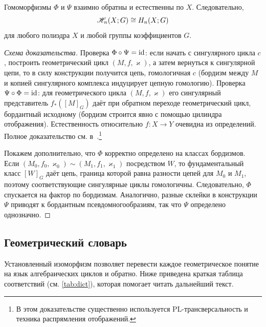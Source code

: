 \documentclass[12pt]{article}
\begin{document}
\begin{theorem}
Гомоморфизмы $\Phi$ и $\Psi$ взаимно обратны и естественны по $X$. Следовательно,
\begin{equation}\label{eq:BRSiso}
\mathscr{H}_n(X;G) \cong H_n(X;G)
\end{equation}
для любого полиэдра $X$ и любой группы коэффициентов $G$.
\end{theorem}
\begin{proof}[Схема доказательства]
Проверка $\Phi \circ \Psi = \operatorname{id}$: если начать с сингулярного цикла $c$, построить геометрический цикл $(M,f,\varkappa)$, а затем вернуться к сингулярной цепи, то в силу конструкции получится цепь, гомологичная $c$ (бордизм между $M$ и копией сингулярного комплекса индуцирует цепную гомологию). Проверка $\Psi \circ \Phi = \operatorname{id}$: для геометрического цикла $(M,f,\varkappa)$ его сингулярный представитель $f_*([M]_G)$ даёт при обратном переходе геометрический цикл, бордантный исходному (бордизм строится явно с помощью цилиндра отображения). Естественность относительно $f:X\to Y$ очевидна из определений. Полное доказательство см. в~\cite{BRS}.\footnote{В этом доказательстве существенно используется PL-трансверсальность и техника распрямления отображений.} %

Покажем дополнительно, что $\Phi$ корректно определено на классах бордизмов. Если $(M_0,f_0,\varkappa_0)\sim (M_1,f_1,\varkappa_1)$ посредством $W$, то фундаментальный класс $[W]_G$ даёт цепь, граница которой равна разности цепей для $M_0$ и $M_1$, поэтому соответствующие сингулярные циклы гомологичны. Следовательно, $\Phi$ спускается на фактор по бордизмам. Аналогично, разные склейки в конструкции $\Psi$ приводят к бордантным псевдомногообразиям, так что $\Psi$ определено однозначно.
\end{proof}

\subsection{Геометрический словарь}

Установленный изоморфизм позволяет перевести каждое геометрическое понятие на язык алгебраических циклов и обратно. Ниже приведена краткая таблица соответствий (см. \cref{tab:dict}), которая помогает читать дальнейший текст.
\end{document}
